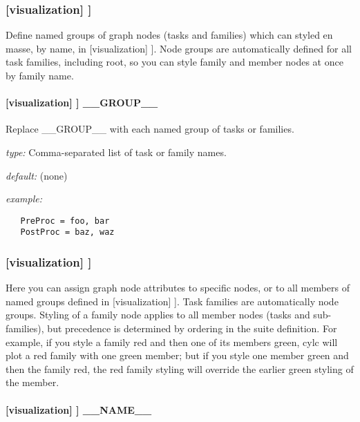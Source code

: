 \subsubsection[{[[}node groups{]]}]{[visualization] \textrightarrow [[node groups]]}

Define named groups of graph nodes (tasks and families) which can styled
en masse, by name, in [visualization] \textrightarrow [[node attributes]].
Node groups are automatically defined for all task families, including
root, so you can style family and member nodes at once by family name.

\paragraph[\_\_GROUP\_\_]{[visualization] \textrightarrow [[node groups]] \textrightarrow \_\_GROUP\_\_}

Replace \_\_GROUP\_\_ with each named group of tasks or families.

\begin{myitemize}
    \item {\em type:} Comma-separated list of task or family names.
    \item {\em default:} (none)
    \item {\em example:}
\begin{lstlisting}
   PreProc = foo, bar
   PostProc = baz, waz
\end{lstlisting}
\end{myitemize}

\subsubsection[{[[}node attributes{]]}]{[visualization] \textrightarrow [[node attributes]]}

Here you can assign graph node attributes to specific nodes, or to all
members of named groups defined in [visualization] \textrightarrow [[node
groups]]. Task families are automatically node groups. Styling of a
family node applies to all member nodes (tasks and sub-families), but
precedence is determined by ordering in the suite definition.  For
example, if you style a family red and then one of its members green,
cylc will plot a red family with one green member; but if you style one
member green and then the family red, the red family styling will
override the earlier green styling of the member.

\paragraph[\_\_NAME\_\_]{[visualization] \textrightarrow [[node attributes]] \textrightarrow \_\_NAME\_\_}

